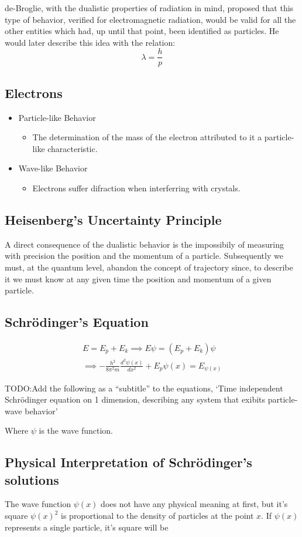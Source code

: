\documentclass{article}[10pt]
\begin{document}
de-Broglie, with the dualistic properties of radiation in mind,
proposed that this type of behavior, verified for electromagnetic radiation,
would be valid for all the other entities which had, up until that point, been
identified as particles. He would later describe this idea with the
relation:
$$\lambda = \frac{h}{p}$$
\subsection{Electrons}
\begin{itemize}
    \item Particle-like Behavior
          \begin{itemize}
              \item The determination of the mass of the electron attributed to
                    it a particle-like characteristic.
          \end{itemize}
    \item Wave-like Behavior
          \begin{itemize}
              \item Electrons suffer difraction when interferring with crystals.
          \end{itemize}
\end{itemize}
\subsection{Heisenberg's Uncertainty Principle}
A direct consequence of the dualistic behavior is the impossibily of measuring
with precision the position and the momentum of a particle. Subsequently we
must, at the quantum level, abandon the concept of trajectory since, to describe
it we must know at any given time the position and momentum of a given particle.
\subsection{Schrödinger's Equation}
\begin{align*}
    E = E_p + E_k \implies E\psi = (E_p + E_k)\psi \\
    \implies -\frac{h^2}{8\pi^2 m}\frac{d^2\psi(x)}{dx^2} + E_p\psi(x) = E_{\psi(x)}
\end{align*}

TODO:\@ Add the following as a ``subtitle'' to the equations, `Time independent
Schrödinger equation on 1 dimension, describing any system that exibits
particle-wave behavior'

Where $\psi$ is the wave function.
\subsection{Physical Interpretation of Schrödinger's solutions}

The wave function $\psi(x)$ does not have any physical meaning at first, but
it's square $\psi{(x)}^2$ is proportional to the density of particles at the point
$x$. If $\psi(x)$ represents a single particle, it's square will be
\end{document}
